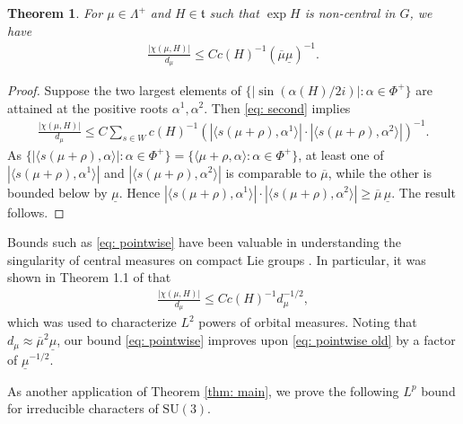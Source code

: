 \documentclass{amsart}
\numberwithin{equation}{section}
\newtheorem{thm}{Theorem}[section]
\numberwithin{equation}{section}
\begin{document}
\begin{thm}
For $\mu\in\Lambda^+$ and $H\in\mathfrak{t}$ such that $\exp H$ is non-central in $G$, we have 
\begin{align}\label{eq: pointwise}
    \frac{|\chi(\mu,H)|}{d_\mu}
    \leq C c(H)^{-1}(\overline{\mu}\underline{\mu})^{-1}.
\end{align}
\end{thm}
\begin{proof}
Suppose the two largest elements of 
$\{|\sin(\alpha(H)/2i)|:\alpha\in\Phi^+\}$ 
are attained at the positive roots $\alpha^1,\alpha^2$. Then 
\eqref{eq: second} implies 
\begin{align*}
    \frac{|\chi(\mu,H)|}{d_\mu}
    \leq C\sum_{s\in W} c(H)^{-1}(|\langle s(\mu+\rho),\alpha^1\rangle|\cdot|\langle s(\mu+\rho),\alpha^2\rangle|)^{-1}.
\end{align*}
As $\{|\langle s(\mu+\rho),\alpha\rangle|:\alpha\in\Phi^+\}
=
\{\langle \mu+\rho,\alpha\rangle:\alpha\in\Phi^+\}$, at least one of
$
|\langle s(\mu+\rho),\alpha^1\rangle|$ and  $|\langle s(\mu+\rho),\alpha^2\rangle|$ 
is comparable to $\overline{\mu}$, while the other is bounded below by $\underline{\mu}$. Hence
\(
|\langle s(\mu+\rho),\alpha^1\rangle|\cdot
|\langle s(\mu+\rho),\alpha^2\rangle|
\geq
\overline{\mu}\,\underline{\mu}
\). The result follows.  
\end{proof}

Bounds such as \eqref{eq: pointwise} have been valuable in understanding the singularity of central measures on compact Lie groups \cite{Har98, HWY00}. In particular, it was shown in Theorem 1.1 of \cite{HWY00} that 
\begin{align}\label{eq: pointwise old}
    \frac{|\chi(\mu,H)|}{d_\mu}
    \leq C c(H)^{-1}d_{\mu}^{-1/2},
\end{align}
which was used to characterize $L^2$ powers of orbital measures. 
Noting that \(d_\mu \approx \overline{\mu}^2 \underline{\mu}\), our bound \eqref{eq: pointwise} improves upon \eqref{eq: pointwise old} by a factor of \(\underline{\mu}^{-1/2}\). 

As another application of Theorem \ref{thm: main}, we prove the following $L^p$ bound for irreducible characters of $\mathrm{SU}(3)$. 
\end{document}
